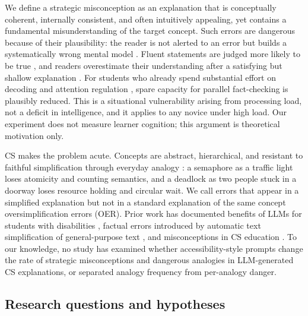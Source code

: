 \documentclass[journal,article,submit,pdftex,moreauthors]{Definitions/mdpi}
\begin{document}
We define a strategic misconception as an explanation that is conceptually coherent, internally consistent, and often intuitively appealing, yet contains a fundamental misunderstanding of the target concept. Such errors are dangerous because of their plausibility: the reader is not alerted to an error but builds a systematically wrong mental model \cite{posner1982accommodation, chi1994things, vosniadou1992mental, qian2017misconceptions, sorva2013notional}. Fluent statements are judged more likely to be true \cite{reber1999effects, alter2009uniting}, and readers overestimate their understanding after a satisfying but shallow explanation \cite{rozenblit2002misunderstood}. For students who already spend substantial effort on decoding and attention regulation \cite{snowling2019dyslexia, barkley2015attention, martinussen2005meta}, spare capacity for parallel fact-checking is plausibly reduced. This is a situational vulnerability arising from processing load, not a deficit in intelligence, and it applies to any novice under high load. Our experiment does not measure learner cognition; this argument is theoretical motivation only.

CS makes the problem acute. Concepts are abstract, hierarchical, and resistant to faithful simplification through everyday analogy \cite{stone2024analogies, sorva2013notional, benari2001constructivism}: a semaphore as a traffic light loses atomicity and counting semantics, and a deadlock as two people stuck in a doorway loses resource holding and circular wait. We call errors that appear in a simplified explanation but not in a standard explanation of the same concept oversimplification errors (OER). Prior work has documented benefits of LLMs for students with disabilities \cite{zdravkova2022cutting, gadiraju2023wouldnt}, factual errors introduced by automatic text simplification of general-purpose text \cite{devaraj2022evaluating, trienes2024infolossqa}, and misconceptions in CS education \cite{qian2017misconceptions, stone2024analogies}. To our knowledge, no study has examined whether accessibility-style prompts change the rate of strategic misconceptions and dangerous analogies in LLM-generated CS explanations, or separated analogy frequency from per-analogy danger.

\subsection*{Research questions and hypotheses}
\end{document}
